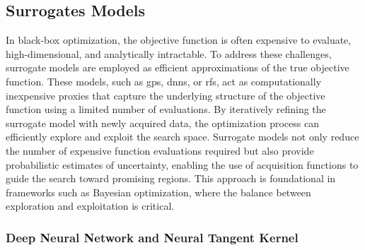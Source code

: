 



\subsection{Surrogates Models}
In black-box optimization, the objective function is often expensive to evaluate, high-dimensional, and analytically intractable. To address these challenges, surrogate models are employed as efficient approximations of the true objective function. These models, such as \acfp{gp}, \acfp{dnn}, or \acfp{rf}, act as computationally inexpensive proxies that capture the underlying structure of the objective function using a limited number of evaluations. By iteratively refining the surrogate model with newly acquired data, the optimization process can efficiently explore and exploit the search space. Surrogate models not only reduce the number of expensive function evaluations required but also provide probabilistic estimates of uncertainty, enabling the use of acquisition functions to guide the search toward promising regions. This approach is foundational in frameworks such as Bayesian optimization, where the balance between exploration and exploitation is critical.



\subsubsection{Deep Neural Network and Neural Tangent Kernel}
\label{background:ntk}

